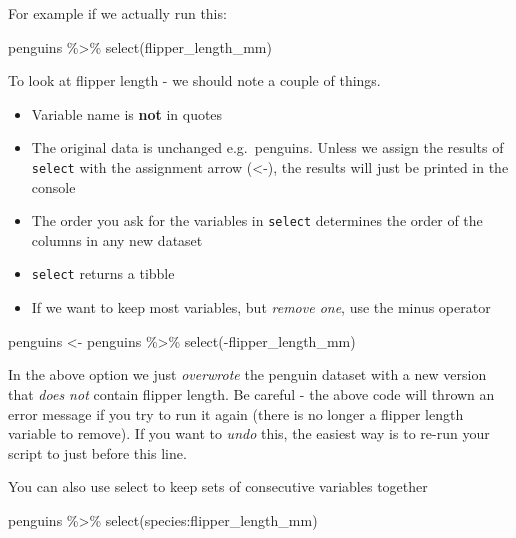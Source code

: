 \documentclass[
]{book}
\makeatletter
\newenvironment{Shaded}{\begin{snugshade}}{\end{snugshade}}
\newcommand{\FunctionTok}[1]{\textcolor[rgb]{0.00,0.00,0.00}{#1}}
\newcommand{\NormalTok}[1]{#1}
\newcommand{\OtherTok}[1]{\textcolor[rgb]{0.56,0.35,0.01}{#1}}
\newcommand{\SpecialCharTok}[1]{\textcolor[rgb]{0.00,0.00,0.00}{#1}}
\newenvironment{kframe}{%
\medskip{}
\setlength{\fboxsep}{.8em}
 \def\at@end@of@kframe{}%
 \ifinner\ifhmode%
  \def\at@end@of@kframe{\end{minipage}}%
  \begin{minipage}{\columnwidth}%
 \fi\fi%
 \def\FrameCommand##1{\hskip\@totalleftmargin \hskip-\fboxsep
 \colorbox{shadecolor}{##1}\hskip-\fboxsep
     \hskip-\linewidth \hskip-\@totalleftmargin \hskip\columnwidth}%
 \MakeFramed {\advance\hsize-\width
   \@totalleftmargin\z@ \linewidth\hsize
   \@setminipage}}%
 {\par\unskip\endMakeFramed%
 \at@end@of@kframe}
\newenvironment{block}[1]
  {
  \begin{itemize}
  \renewcommand{\labelitemi}{
    \raisebox{-.7\height}[0pt][0pt]{
      {\setkeys{Gin}{width=3em,keepaspectratio}\texttt{[image: images/\#1]}}
    }
  }
  \setlength{\fboxsep}{1em}
  \begin{kframe}
  \item
  }
  {
  \end{kframe}
  \end{itemize}
  }
\newenvironment{rmdwarning}
  {\begin{block}{warning}}
  {\end{block}}
\makeatother
\begin{document}
For example if we actually run this:

\begin{Shaded}
\begin{Highlighting}[]
\NormalTok{penguins }\SpecialCharTok{\%\textgreater{}\%} 
  \FunctionTok{select}\NormalTok{(flipper\_length\_mm)}
\end{Highlighting}
\end{Shaded}

To look at flipper length - we should note a couple of things.

\begin{itemize}
\item
  Variable name is \textbf{not} in quotes
\item
  The original data is unchanged e.g.~penguins. Unless we assign the results of \texttt{select} with the assignment arrow (\textless-), the results will just be printed in the console
\item
  The order you ask for the variables in \texttt{select} determines the order of the columns in any new dataset
\item
  \texttt{select} returns a tibble
\item
  If we want to keep most variables, but \emph{remove one}, use the minus operator
\end{itemize}

\begin{Shaded}
\begin{Highlighting}[]
\NormalTok{penguins }\OtherTok{\textless{}{-}}\NormalTok{ penguins }\SpecialCharTok{\%\textgreater{}\%} 
  \FunctionTok{select}\NormalTok{(}\SpecialCharTok{{-}}\NormalTok{flipper\_length\_mm)}
\end{Highlighting}
\end{Shaded}

\begin{rmdwarning}
In the above option we just \emph{overwrote} the penguin dataset with a
new version that \emph{does not} contain flipper length. Be careful -
the above code will thrown an error message if you try to run it again
(there is no longer a flipper length variable to remove). If you want to
\emph{undo} this, the easiest way is to re-run your script to just
before this line.
\end{rmdwarning}

You can also use select to keep sets of consecutive variables together

\begin{Shaded}
\begin{Highlighting}[]
\NormalTok{penguins }\SpecialCharTok{\%\textgreater{}\%} 
  \FunctionTok{select}\NormalTok{(species}\SpecialCharTok{:}\NormalTok{flipper\_length\_mm)}
\end{Highlighting}
\end{Shaded}
\end{document}
